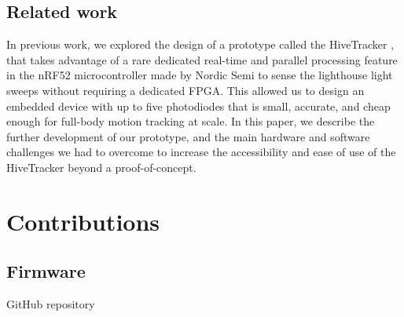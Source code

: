 \documentclass[sigchi]{acmart}
\begin{document}
\subsection{Related work}
In previous work, we explored the design of a prototype called the HiveTracker \cite{Quinones2018}, that takes advantage of a rare dedicated real-time and parallel processing feature in the nRF52 microcontroller made by Nordic Semi to sense the lighthouse light sweeps without requiring a dedicated FPGA. This allowed us to design an embedded device with up to five photodiodes that is small, accurate, and cheap enough for full-body motion tracking at scale. \newline \newline
In this paper, we describe the further development of our prototype, and the main hardware and software challenges we had to overcome to increase the accessibility and ease of use of the HiveTracker beyond a proof-of-concept.

\section{Contributions}


\subsection{Firmware}


GitHub repository \cite{firmwareRepo}
\end{document}
